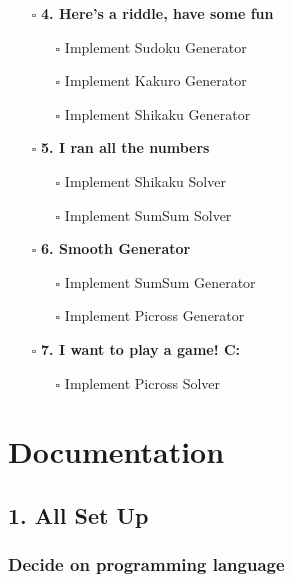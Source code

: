 \documentclass{article}
\begin{document}
	\begin{minipage}[t]{0.45\textwidth}
		\strut\vspace*{-\baselineskip}\newline
		\begin{itemize}
			\item[$\square$] \textbf{4. Here's a riddle, have some fun}
			\begin{itemize}
				\item[$\square$] Implement Sudoku Generator
				\item[$\square$] Implement Kakuro Generator
				\item[$\square$] Implement Shikaku Generator
			\end{itemize}
			\item[$\square$] \textbf{5. I ran all the numbers}
			\begin{itemize}
				\item[$\square$] Implement Shikaku Solver
				\item[$\square$] Implement SumSum Solver
			\end{itemize}
			\item[$\square$] \textbf{6. Smooth Generator}
			\begin{itemize}
				\item[$\square$] Implement SumSum Generator
				\item[$\square$] Implement Picross Generator
			\end{itemize}
			\item[$\square$] \textbf{7. I want to play a game! C:}
			\begin{itemize}
				\item[$\square$] Implement Picross Solver
			\end{itemize}
		\end{itemize}
	\end{minipage}

	\newpage
	
	\section*{Documentation}
	
	\subsection*{1. All Set Up}
	
	\subsubsection*{Decide on programming language}
	
\end{document}
